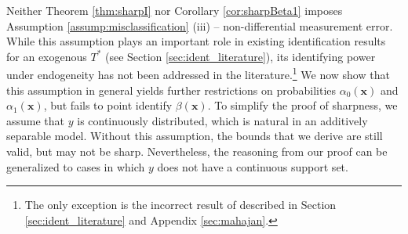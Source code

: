 
Neither Theorem \ref{thm:sharpI} nor Corollary \ref{cor:sharpBeta1} imposes Assumption \ref{assump:misclassification} (iii) -- non-differential measurement error.
While this assumption plays an important role in existing identification results for an exogenous $T^*$ (see Section \ref{sec:ident_literature}), its identifying power under endogeneity has not been addressed in the literature.\footnote{The only exception is the incorrect result of \cite{Mahajan} described in Section \ref{sec:ident_literature} and Appendix \ref{sec:mahajan}.}
We now show that this assumption in general yields further restrictions on probabilities $\alpha_0(\mathbf{x})$ and $\alpha_1(\mathbf{x})$, but fails to point identify $\beta(\mathbf{x})$.
To simplify the proof of sharpness, we assume that $y$ is continuously distributed, which is natural in an additively separable model.
Without this assumption, the bounds that we derive are still valid, but may not be sharp. 
Nevertheless, the reasoning from our proof can be generalized to cases in which $y$ does not have a continuous support set.

